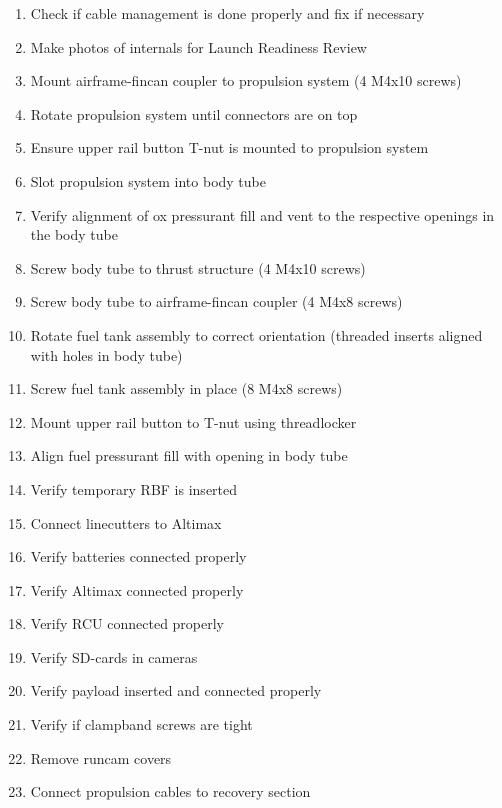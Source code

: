 \begin{enumerate}[label=R\arabic*.]
    \item \label{rocket_non_energetic_start} Check if cable management is done properly and fix if necessary\checkbox
    \item Make photos of internals for Launch Readiness Review\checkbox
    \item Mount airframe-fincan coupler to propulsion system (4 M4x10 screws)\checkbox
    \item Rotate propulsion system until connectors are on top \checkbox
    \item Ensure upper rail button T-nut is mounted to propulsion system \checkbox
    \item Slot propulsion system into body tube \checkbox
    \item Verify alignment of ox pressurant fill and vent to the respective openings in the body tube \checkbox
    \item Screw body tube to thrust structure (4 M4x10 screws)\checkbox
    \item Screw body tube to airframe-fincan coupler (4 M4x8 screws) \checkbox
    \item Rotate fuel tank assembly to correct orientation (threaded inserts aligned with holes in body tube) \checkbox
    \item Screw fuel tank assembly in place (8 M4x8 screws) \checkbox
    \item Mount upper rail button to T-nut using threadlocker\checkbox
    \item Align fuel pressurant fill with opening in body tube \checkbox
    \item Verify temporary RBF is inserted\checkbox
    \item Connect linecutters to Altimax \checkbox
    \item Verify batteries connected properly \checkbox
    \item Verify Altimax connected properly \checkbox
    \item Verify RCU connected properly \checkbox
    \item Verify SD-cards in cameras \checkbox
    \item Verify payload inserted and connected properly \checkbox
    \item Verify if clampband screws are tight \checkbox
    \item Remove runcam covers \checkbox
    \item Connect propulsion cables to recovery section \checkbox

\end{enumerate}
